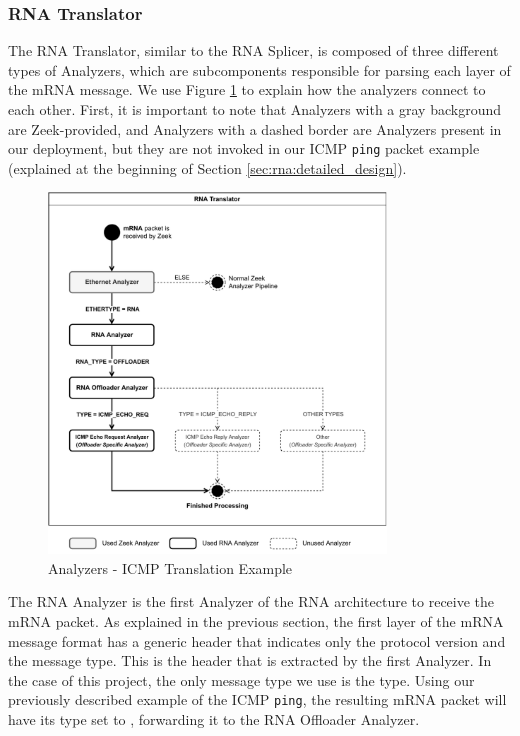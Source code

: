 \subsubsection*{RNA Translator}

The RNA Translator, similar to the RNA Splicer, is composed of three different types of Analyzers, which are subcomponents responsible for parsing each layer of the mRNA message. We use Figure \ref{fig:icmp_ex_translator} to explain how the analyzers connect to each other. First, it is important to note that Analyzers with a gray background are Zeek-provided, and Analyzers with a dashed border are Analyzers present in our deployment, but they are not invoked in our ICMP \texttt{ping} packet example (explained at the beginning of Section \ref{sec:rna:detailed_design}).

\begin{figure}[ht]
    \caption{Analyzers - ICMP Translation Example}
    \begin{center}
        \includegraphics[width=0.8\textwidth]{images/icmp_ex_translator.pdf}  
    \end{center}
    \label{fig:icmp_ex_translator}
\end{figure}

The RNA Analyzer is the first Analyzer of the RNA architecture to receive the mRNA packet. As explained in the previous section, the first layer of the mRNA message format has a generic header that indicates only the protocol version and the message type. This is the header that is extracted by the first Analyzer. In the case of this project, the only message type we use is the \Offloader{} type\footnotemark. Using our previously described example of the ICMP \texttt{ping}, the resulting mRNA packet will have its type set to \textsc{\Offloader{}}, forwarding it to the RNA Offloader Analyzer.

